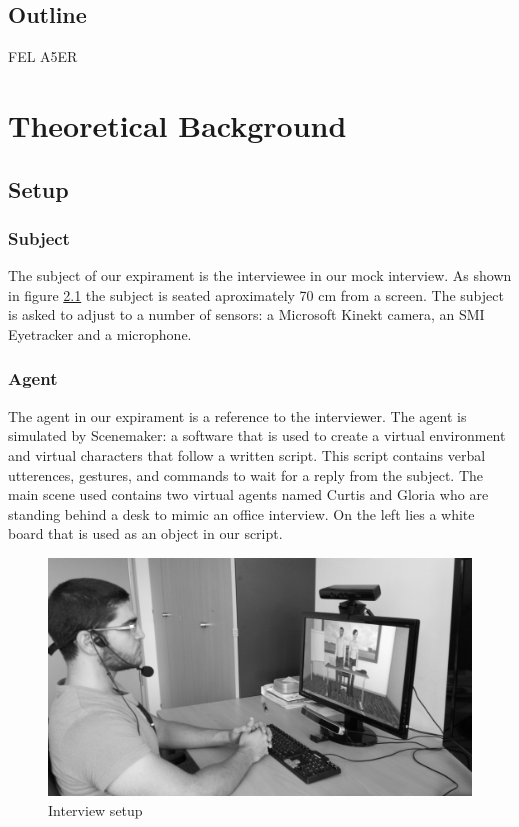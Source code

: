 \documentclass[12pt, a4paper, fleqn]{memoir}%
\begin{document}
\section{Outline}
\label{sec:Outline}
FEL A5ER

\chapter{Theoretical Background}
\label{chap:TheoreticalBackground}

\section{Setup}
\label{sec:Section}

\subsection{Subject}
The subject of our expirament is the interviewee in our mock interview. As shown in figure \ref{fig:setup_img} the subject is seated aproximately 70 cm from a screen. The subject is asked to adjust to a number of sensors: a Microsoft Kinekt camera, an SMI Eyetracker and a microphone.

\subsection{Agent}
\label{subsec:Agent}
The agent in our expirament is a reference to the interviewer. The agent is simulated by Scenemaker: a software that is used to create a virtual environment and virtual characters that follow a written script. This script contains verbal utterences, gestures, and commands to wait for a reply from the subject. The main scene used contains two virtual agents named Curtis and Gloria who are standing behind a desk to mimic an office interview. On the left lies a white board that is used as an object in our script.

\begin{figure}[h]
    \centering
    \includegraphics[width=1\textwidth]{setup}
    \caption{Interview setup}
    \label{fig:setup_img}
\end{figure}
\end{document}
